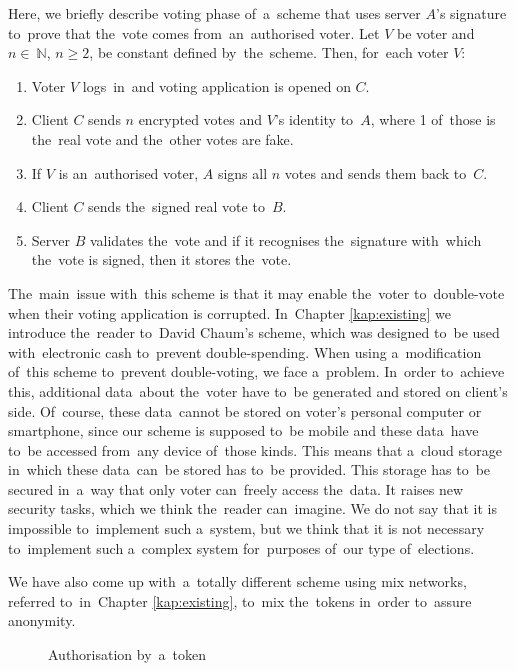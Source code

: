 Here, we briefly describe voting phase of~a~scheme that uses server $A$'s signature to~prove that the~vote comes from~an~authorised voter. 
\bigbreak
Let $V$ be voter and $n \in~\mathbb{N}$, $n \ge 2$, be constant defined by~the~scheme. Then, for~each voter $V$:
\begin{enumerate}
\item Voter $V$ logs~in~and voting application is opened on $C$.
\item Client $C$ sends $n$ encrypted votes and $V$'s identity to~$A$, where 1 of~those is the~real vote and the~other votes are fake.
\item If $V$ is an~authorised voter, $A$ signs all $n$ votes and sends them back to~$C$.
\item Client $C$ sends the~signed real vote to~$B$.
\item Server $B$ validates the~vote and if it recognises the~signature with~which the~vote is signed, then it stores the~vote.
\end{enumerate}

The~main~issue with~this scheme is that it may enable the~voter to~double-vote when their voting application is corrupted. In~Chapter \ref{kap:existing} we introduce the~reader to~David Chaum's scheme, which was designed to~be used with~electronic cash to~prevent double-spending. When using a~modification of~this scheme to~prevent double-voting, we face a~problem. In~order to~achieve this, additional data~about the~voter have to~be generated and stored on client's side. Of~course, these data~cannot be stored on voter's personal computer or smartphone, since our scheme is supposed to~be mobile and these data~have to~be accessed from~any device of~those kinds. This means that a~cloud storage in~which these data~can~be stored has to~be provided. This storage has to~be secured in~a~way that only voter can~freely access the~data. It raises new security tasks, which we think the~reader can~imagine. We do not say that it is impossible to~implement such a~system, but we think that it is not necessary to~implement such a~complex system for~purposes of~our type of~elections.

We have also come up with~a~totally different scheme using mix networks, referred to~in~Chapter \ref{kap:existing}, to~mix the~tokens in~order to~assure anonymity.

\begin{figure}[h]
\begin{center}
\caption{Authorisation by~a~token}
\end{center}
\end{figure}

